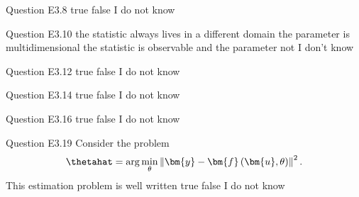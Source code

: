 \begin{frame}{Question E3.8}
	\QuestionNotes{}
	\QuestionAnswers
	{
		\correctanswer true
		\answer false
		\answer I do not know
	}
\end{frame}


\begin{frame}{Question E3.10}
	\QuestionNotes{}
	\QuestionAnswers
	{
		\answer the statistic always lives in a different domain
		\answer the parameter is multidimensional
		\correctanswer the statistic is observable and the parameter not
		\answer I don't know
	}
\end{frame}


\begin{frame}{Question E3.12}
	\QuestionNotes{}
	\QuestionAnswers
	{
		\answer true
		\correctanswer false
		\answer I do not know
	}
\end{frame}

\begin{frame}{Question E3.14}
	\QuestionNotes{}
	\QuestionAnswers
	{
		\answer true
		\correctanswer false
		\answer I do not know
	}
\end{frame}


\begin{frame}{Question E3.16}
	\QuestionNotes{}
	\QuestionAnswers
	{
		\answer true
		\correctanswer false
		\answer I do not know
	}
\end{frame}

\begin{frame}{Question E3.19}
	\QuestionNotes{}
	\QuestionBody
	{
		Consider the problem
		$$
			\thetahat = \arg \min_{\theta} \left\| \bm{y} - \bm{f} \left( \bm{u}, \theta \right) \right\|^{2} .
		$$
		This estimation problem is well written
	}
	\QuestionAnswers
	{
		\answer true
		\correctanswer false
		\answer I do not know
	}
\end{frame}


